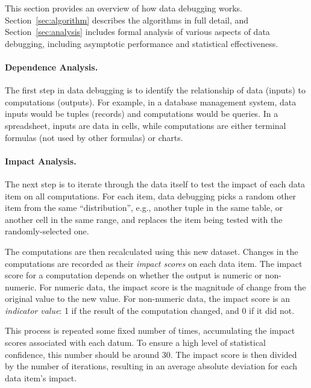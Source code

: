 This section provides an overview of how data debugging
works. Section~\ref{sec:algorithm} describes the algorithms in full
detail, and Section~\ref{sec:analysis} includes formal analysis of various
aspects of data debugging, including asymptotic performance and
statistical effectiveness.

\paragraph{Dependence Analysis.}
The first step in data debugging is to identify the relationship of
data (inputs) to computations (outputs). For example, in a database
management system, data inputs would be tuples (records) and computations would
be queries. In a spreadsheet, inputs are data in cells, while
computations are either terminal formulas (not used by other formulas)
or charts.

\paragraph{Impact Analysis.}
The next step is to iterate through the data itself to test the impact
of each data item on all computations. For each item, data debugging
picks a random other item from the same ``distribution'', e.g.,
another tuple in the same table, or another cell in the same range,
and replaces the item being tested with the randomly-selected one.

The computations are then recalculated using this new dataset. Changes
in the computations are recorded as their \emph{impact scores} on each
data item.  The impact score for a computation depends on whether the
output is numeric or non-numeric. For numeric data, the impact score
is the magnitude of change from the original value to the new value.
For non-numeric data, the impact score is an \emph{indicator value}: 1
if the result of the computation changed, and 0 if it did not.


This process is repeated some fixed number of times, accumulating the
impact scores associated with each datum. To ensure a high level of
statistical confidence, this number should be around 30. The impact
score is then divided by the number of iterations, resulting in an
average absolute deviation for each data item's impact.

